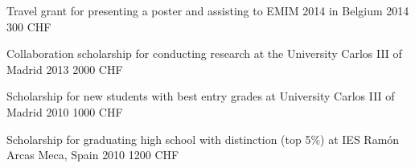 \begin{cvhonors}
\cvhonor
{Travel grant}
{for presenting a poster and assisting to EMIM 2014 in Belgium}
{2014} %
{300 CHF}

\cvhonor
{Collaboration scholarship}
{for conducting research 
at the University Carlos III of Madrid}
{2013} %
{2000 CHF}

\cvhonor
{Scholarship}
{for new students with best entry grades at University Carlos III of Madrid}
{2010} %
{1000 CHF}

\cvhonor
{Scholarship}
{for graduating high school with distinction (top 5\%) at IES Ramón Arcas Meca, Spain}
{2010} %
{1200 CHF}

\end{cvhonors}